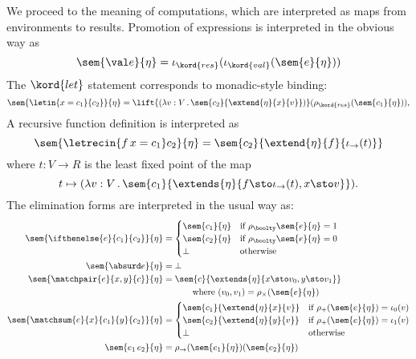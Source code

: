 We proceed to the meaning of computations, which are interpreted as maps from
environments to results. Promotion of expressions is interpreted in the obvious way as
%
\begin{equation*}
  \sem{\val e}{\eta} = \iota_{\kord{res}}(\iota_\kord{val}(\sem{e}{\eta}))
\end{equation*}
%
The $\kord{let}$ statement corresponds to monadic-style binding:
%
\begin{equation*}
  \sem{\letin{x = c_1}{c_2}}{\eta} =
  \lift{(\lambda v : V \,.\, \sem{c_2}{\extend{\eta}{x}{v}})}
  (\rho_{\kord{res}}(\sem{c_1}{\eta})),
\end{equation*}
%
A recursive function definition is interpreted as
%
\begin{equation*}
  \sem{\letrecin{f \, x = c_1} c_2}{\eta} = \sem{c_2}{\extend{\eta}{f}{\iota_\to(t)}}
\end{equation*}
%
where $t : V \to R$ is the least fixed point of the map
%
\begin{equation*}
  t \mapsto (\lambda v : V \,.\, \sem{c_1}{\extends{\eta}{f \sto \iota_\to(t), x \sto v}}).
\end{equation*}
%
The elimination forms are interpreted in the usual way as:
\begin{align*}
  \sem{\ifthenelse{e}{c_1}{c_2}}{\eta} &=
  \begin{cases}
    \sem{c_1}{\eta} & \text{if $\rho_{\boolty}{\sem{e}{\eta}} = 1$} \\
    \sem{c_2}{\eta} & \text{if $\rho_{\boolty}{\sem{e}{\eta}} = 0$} \\
    \bot & \text{otherwise}
  \end{cases}
  \\
  \sem{\absurd e}{\eta} &= \bot
  \\
  \sem{\matchpair{e}{x,y}{c}}{\eta} &=
  \begin{aligned}[t]
  &\sem{c}{\extends{\eta}{x \sto v_0, y \sto v_1}} \\
  &\qquad \text{where $(v_0, v_1) = \rho_\times (\sem{e}{\eta})$}
  \end{aligned}
  \\
  \sem{\matchsum{e}{x}{c_1}{y}{c_2}}{\eta} &=
  \begin{cases}
    \sem{c_1}{\extend{\eta}{x}{v}} & \text{if $\rho_{+}(\sem{e}{\eta}) = \iota_0(v)$} \\
    \sem{c_2}{\extend{\eta}{y}{v}} & \text{if $\rho_{+}(\sem{e}{\eta}) = \iota_1(v)$} \\
    \bot & \text{otherwise}
  \end{cases}
  \\
  \sem{e_1 \, e_2}{\eta} &= \rho_\to(\sem{e_1}{\eta}) (\sem{e_2}{\eta})
\end{align*}  
